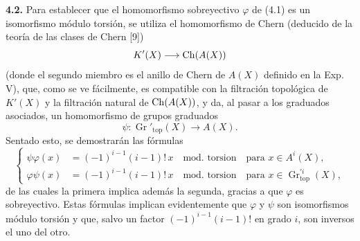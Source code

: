 \textbf{4.2.} Para establecer que el homomorfismo sobreyectivo $\varphi$ de
(4.1) es un isomorfismo módulo torsión, se utiliza el homomorfismo de Chern
(deducido de la teoría de las clases de Chern [9])
\[
 K'(X)\longrightarrow \operatorname{Ch}(A(X))
\]
(donde el segundo miembro es el anillo de Chern de $A(X)$ definido en la Exp.
V), que, como se ve fácilmente, es compatible con la filtración topológica de
$K'(X)$ y la filtración natural de $\operatorname{Ch}(A(X))$, y da, al pasar a los graduados
asociados, un homomorfismo de grupos graduados
\begin{equation}\tag{4.3}
 \psi:\operatorname{Gr}'_{\mathrm{top}}(X)\longrightarrow A(X).
\end{equation}
Sentado esto, se demostrarán las fórmulas
\begin{equation}\tag{4.4}
\left\{
\begin{aligned}
 \psi\varphi(x)&=(-1)^{i-1}(i-1)!\,x\quad \text{mod. torsion}\quad \text{para }x\in A^i(X),\\
 \varphi\psi(x)&=(-1)^{i-1}(i-1)!\,x\quad \text{mod. torsion}\quad \text{para }x\in \operatorname{Gr}_{\mathrm{top}}^{\prime i}(X),
\end{aligned}
\right.
\end{equation}
de las cuales la primera implica además la segunda, gracias a que $\varphi$
es sobreyectivo. Estas fórmulas implican evidentemente que $\varphi$ y $\psi$
son isomorfismos módulo torsión y que, salvo un factor
$(-1)^{i-1}(i-1)!$ en grado $i$, son inversos el uno del otro.

